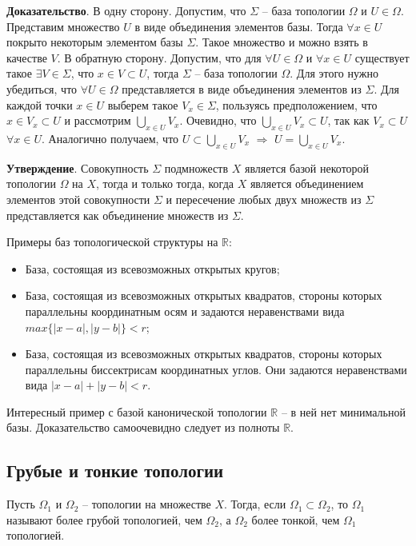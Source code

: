 \documentclass[a4paper]{book}
\begin{document}
\textbf{Доказательство}. В одну сторону. Допустим, что $\varSigma$ -- база топологии $\Omega$ и $U\in\Omega$. Представим множество $U$ в виде объединения элементов базы. Тогда $\forall x\in U$ покрыто некоторым элементом базы $\varSigma$. Такое множество и можно взять в качестве $V$. В обратную сторону. Допустим, что для $\forall U\in \Omega$ и $\forall x\in U$ существует такое $\exists V\in\varSigma$, что $x\in V\subset U$, тогда $\varSigma$ -- база топологии $\Omega$. Для этого нужно убедиться, что $\forall U\in\Omega$ представляется в виде объединения элементов из $\varSigma$. Для каждой точки $x\in U$ выберем такое $V_x\in \varSigma$, пользуясь предположением, что $x\in V_x\subset U$ и рассмотрим $\bigcup_{x\in U} V_x$. Очевидно, что $\bigcup_{x\in U} V_x \subset U$, так как $V_x\subset U$ $\forall x\in U$. Аналогично получаем, что $U\subset \bigcup_{x\in U} V_x$ $\Rightarrow$ $U =\bigcup_{x\in U} V_x$.

\textbf{Утверждение}. Совокупность $\varSigma$ подмножеств $X$ является базой некоторой топологии $\Omega$ на $X$, тогда и только тогда, когда $X$ является объединением элементов этой совокупности $\varSigma$ и пересечение любых двух множеств из $\varSigma$ представляется как объединение множеств из $\varSigma$. 



Примеры баз топологической структуры на $\mathbb{R}$:
\begin{itemize}
	\item База, состоящая из всевозможных открытых кругов;
	\item База, состоящая из всевозможных открытых квадратов, стороны которых параллельны координатным осям и задаются неравенствами вида $max\{|x-a|,|y-b|\}<r$;
	\item База, состоящая из всевозможных открытых квадратов, стороны которых параллельны биссектрисам координатных углов. Они задаются неравенствами вида $|x-a|+|y-b|<r$.
\end{itemize}

Интересный пример с базой канонической топологии $\mathbb{R}$ -- в ней нет минимальной базы. Доказательство самоочевидно следует из полноты $\mathbb{R}$. 

\subsection{Грубые и тонкие топологии}

Пусть $\Omega_1$ и $\Omega_2$ -- топологии на множестве $X$. Тогда, если $\Omega_1 \subset \Omega_2$, то $\Omega_1$ называют более грубой топологией, чем $\Omega_2$, а $\Omega_2$ более тонкой, чем $\Omega_1$ топологией. 
\end{document}
